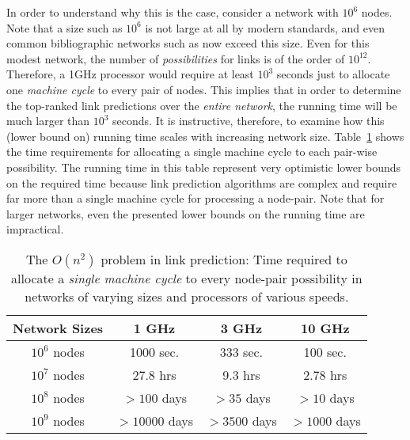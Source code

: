 In order to understand why this is the case,
consider a network with $10^6$ nodes. Note that a size such as
$10^6$ is not large at all by modern standards, and even common
bibliographic networks such as \DBLP now exceed this size. Even
for this modest network, the number of {\em possibilities} for links
is of the order of $10^{12}$. Therefore, a 1GHz processor would
require at least $10^3$ seconds just to allocate one {\em machine cycle} to
every pair of nodes. This implies that in order to determine the
top-ranked link predictions over the {\em entire network}, the
running time will be much larger than $10^3$ seconds.  It is
instructive, therefore, to examine how this (lower bound on) running
time scales with increasing network size. Table~\ref{time} shows the
time requirements for allocating a single machine cycle to each
pair-wise possibility. The running time in this table represent
very optimistic lower bounds on the required time because link
prediction algorithms are complex and require far more than a single
machine cycle for processing a node-pair. Note that for larger
networks, even the presented lower bounds on the running time are
impractical.
\begin{table}
\caption{The $O(n^2)$ problem in link prediction: Time required to
allocate a {\em single machine cycle} to every node-pair possibility
in networks of varying sizes and processors of various speeds.}
\label{time}
\vspace{-2ex}
\centering
\begin{tabular}{cccc}
\hline \hline Network Sizes & 1 GHz &  3 GHz & 10 GHz \\
\hline \hline $10^6$ nodes & 1000 sec. & 333 sec. & 100 sec.\\
\hline $10^7$ nodes & 27.8 hrs &  9.3 hrs &  2.78 hrs\\
\hline $10^8$ nodes & $>100$ days &  $>35$ days & $> 10$ days\\
\hline $10^9$ nodes & $>10000$ days & $>3500$ days & $> 1000$ days\\
\hline \hline
\end{tabular}
\vspace{-2ex}
\end{table}





